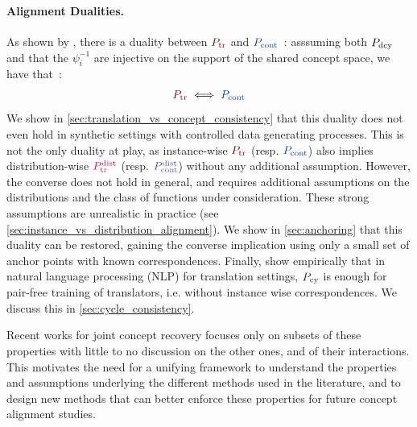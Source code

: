 \documentclass{article}
\begin{document}
\paragraph{Alignment Dualities.} As shown by \citet{TODO:rufin}, there is a duality between $\Ptr$ and $\Pcont$~: asssuming both $P_{\mathrm{dcy}}$ and that the $\psi^{-1}_i$ are injective on the support of the shared concept space, we have that~:
%
\begin{align}
\label{eq:duality}
\Ptr \iff \Pcont
\end{align}
%
We show in \cref{sec:translation_vs_concept_consistency} that this duality does not even hold in synthetic settings with controlled data generating processes.
%
This is not the only duality at play, as instance-wise $\Ptr$ (resp. $\Pcont$) also implies distribution-wise $\Ptrdist$ (resp. $\Pcontdist$) without any additional assumption. However, the converse does not hold in general, and requires additional assumptions on the distributions and the class of functions under consideration. These strong assumptions are unrealistic in practice (see \cref{sec:instance_vs_distribution_alignment}). We show in \cref{sec:anchoring} that this duality can be restored, gaining the converse implication using only a small set of anchor points with known correspondences. Finally, \citet{TODO} show empirically that in natural language processing (NLP) for translation settings, $\Pcy$ is enough for pair-free training of translators, i.e. without instance wise correspondences. We discuss this in \cref{sec:cycle_consistency}.

Recent works for joint concept recovery focuses only on subsets of these properties with little to no discussion on the other ones, and of their interactions. This motivates the need for a unifying framework to understand the properties and assumptions underlying the different methods used in the literature, and to design new methods that can better enforce these properties for future concept alignment studies.
\end{document}
